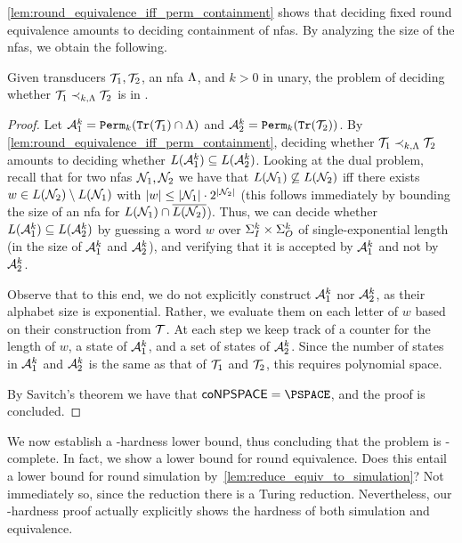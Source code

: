 \autoref{lem:round_equivalence_iff_perm_containment} shows that deciding fixed round equivalence amounts to deciding containment of \glspl{nfa}. By analyzing the size of the \glspl{nfa}, we obtain the following.
\begin{theorem}
	\label{thm:fixed_re_PSPACE}
	Given transducers $\mathcal{T}_1,\mathcal{T}_2$, an \gls{nfa} $\Lambda$, and $k>0$ in unary, the problem of deciding whether $\mathcal{T}_1\prec_{k,\Lambda}\mathcal{T}_2$ is in \PSPACE.
\end{theorem}
\begin{proof}
	Let $\mathcal{A}_1^k={\mathtt{Perm}}_k({\mathtt{Tr}}(\mathcal{T}_1)\cap \Lambda)$ and $\mathcal{A}_2^k={\mathtt{Perm}}_k({\mathtt{Tr}}(\mathcal{T}_2))$. By \autoref{lem:round_equivalence_iff_perm_containment}, deciding whether $\mathcal{T}_1\prec_{k,\Lambda} \mathcal{T}_2$ amounts to deciding whether $L(\mathcal{A}^k_1)\subseteq L(\mathcal{A}^k_2)$. Looking at the dual problem, recall that for two \glspl{nfa} $\mathcal{N}_1, \mathcal{N}_2$ we have that $L(\mathcal{N}_1)\not\subseteq L(\mathcal{N}_2)$ iff 
	there exists $w\in L(\mathcal{N}_2)\setminus L(\mathcal{N}_1)$ with $|w|\le |\mathcal{N}_1|\cdot 2^{|\mathcal{N}_2|}$ (this follows immediately by bounding the size of an \gls{nfa} for $L(\mathcal{N}_1)\cap \overline{L(\mathcal{N}_2)}$). Thus, we can decide whether $L(\mathcal{A}^k_1)\subseteq L(\mathcal{A}^k_2)$ by guessing a word $w$ over $\Sigma_{I}^k\times \Sigma_{O}^k$ of single-exponential length (in the size of $\mathcal{A}^k_1$ and $\mathcal{A}^k_2$), and verifying that it is accepted by $\mathcal{A}^k_1$ and not by $\mathcal{A}^k_2$. 
	
	Observe that to this end, we do not explicitly construct $\mathcal{A}^k_1$ nor $\mathcal{A}^k_2$, as their alphabet size is exponential. Rather, we evaluate them on each letter of $w$ based on their construction from $\mathcal{T}$. At each step we keep track of a counter for the length of $w$, a state of $\mathcal{A}^k_1$, and a set of states of $\mathcal{A}^k_2$. Since the number of states in $\mathcal{A}^k_1$ and $\mathcal{A}^k_2$ is the same as that of $\mathcal{T}_1$ and $\mathcal{T}_2$, this requires polynomial space.
	
	By Savitch's theorem we have that $\mathsf{coNPSPACE}=\PSPACE$, and the proof is concluded.
\end{proof}

We now establish a \PSPACE-hardness lower bound, thus concluding that the problem is \PSPACE-complete. In fact, we show a lower bound for round equivalence. Does this entail a lower bound for round simulation by~\autoref{lem:reduce_equiv_to_simulation}? Not immediately so, since the reduction there is a Turing reduction. Nevertheless, our \PSPACE-hardness proof actually explicitly shows the hardness of both simulation and equivalence.

